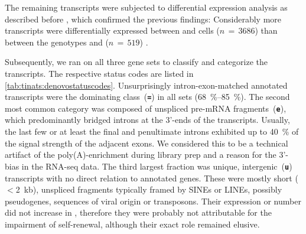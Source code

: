 The remaining transcripts were subjected to differential expression analysis as described before , which confirmed the previous findings: Considerably more transcripts were differentially expressed between \kithi and \kitlow cells ($n\,=\,3686$) than between the genotypes \dnmtchip and \dnmtwt ($n\,=\,519$) . 

Subsequently, we ran \cite{Pertea2016} on all three gene sets to classify and categorize the transcripts. The respective status codes are listed in \autoref{tab:tinats:denovostatuscodes}. Unsurprisingly intron-exon-matched annotated transcripts were the dominating class~(\textbf{\texttt{=}}) in all sets (\SIrange{68}{85}{\percent}). The second most common category was composed of unspliced pre-mRNA fragments~(\textbf{\texttt{e}}), which predominantly bridged introns at the 3'-ends of the transcripts. Usually, the last few or at least the final and penultimate introns exhibited up to \SI{40}{\percent} of the signal strength of the adjacent exons. We considered this to be a technical artifact of the poly(A)-enrichment during library prep and a reason for the 3'-bias in the RNA-seq data. The third largest fraction was unique, intergenic~(\textbf{\texttt{u}}) transcripts with no direct relation to annotated genes. These were mostly short ($<$\SI{2}{\kilo b}), unspliced fragments typically framed by SINEs or LINEs, possibly pseudogenes, sequences of viral origin or transposons. Their expression or number did not increase in \dnmtchip, therefore they were probably not attributable for the impairment of self-renewal, although their exact role remained elusive. 


